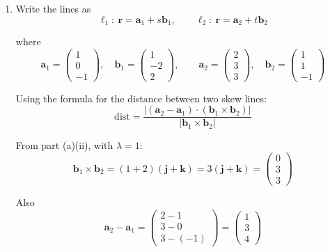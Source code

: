 \documentclass[leqno]{article}
\begin{document}
\begin{enumerate}[
  label=\textbf{\arabic*.},
  leftmargin=*,
  topsep=0pt,
  partopsep=0pt,
  parsep=0pt
]
\begin{djsSolution}
\begin{enumerate}[label=\textbf{(\alph*)}]
\begin{enumerate}[label=(\roman*)]
    gives
    \begin{align*}
    \cos\theta
    &=
    \frac{\left\lvert-2\right\rvert}{(2\sqrt{3})(\sqrt{3})}\\
    &=
    \frac{2}{6}\\
    &=
    \frac{1}{3}
    \end{align*}

    Therefore
    \[
    \theta=\arccos\left(\frac{1}{3}\right)\approx 70.5^\circ
    \]

    Hence the acute angle between the planes is \(\arccos\left(\frac{1}{3}\right)\approx 70.5^\circ\).

    \item
    Write the lines as
    \[
    \ell_1:\ \mathbf{r}=\mathbf{a}_1+s\mathbf{b}_1,
    \qquad
    \ell_2:\ \mathbf{r}=\mathbf{a}_2+t\mathbf{b}_2
    \]

    where
    \[
    \mathbf{a}_1=\begin{pmatrix}1\\0\\-1\end{pmatrix},\quad \mathbf{b}_1=\begin{pmatrix}1\\-2\\2\end{pmatrix},
    \qquad
    \mathbf{a}_2=\begin{pmatrix}2\\3\\3\end{pmatrix},\quad \mathbf{b}_2=\begin{pmatrix}1\\1\\-1\end{pmatrix}
    \]

    Using the formula for the distance between two skew lines:
    \[
    \mathrm{dist}
    =
    \frac{\left\lvert(\mathbf{a}_2-\mathbf{a}_1)\cdot(\mathbf{b}_1\times\mathbf{b}_2)\right\rvert}
    {\left\lvert\mathbf{b}_1\times\mathbf{b}_2\right\rvert}
    \]

    From part (a)(ii), with \(\lambda=1\):
    \[
    \mathbf{b}_1\times\mathbf{b}_2
    =(1+2)(\mathbf{j}+\mathbf{k})
    =3(\mathbf{j}+\mathbf{k})
    =\begin{pmatrix}0\\3\\3\end{pmatrix}
    \]

    Also
    \[
    \mathbf{a}_2-\mathbf{a}_1
    =\begin{pmatrix}2-1\\3-0\\3-(-1)\end{pmatrix}
    =\begin{pmatrix}1\\3\\4\end{pmatrix}
    \]


\end{enumerate}
\end{enumerate}
\end{djsSolution}
\end{enumerate}
\end{document}
